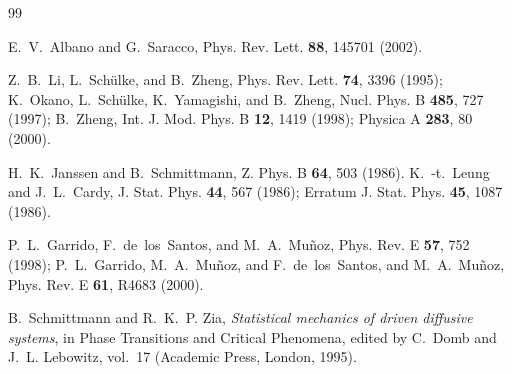 \documentclass[twocolumn,prl,aps]{revtex4}
\begin{document}
\vspace{-1cm}
\begin{thebibliography}{99}

E.~V.~Albano and G.~Saracco,
Phys. Rev. Lett. {\bf 88}, 145701 (2002).

Z.~B.~Li, L.~Sch\"ulke, and B.~Zheng,
Phys. Rev. Lett. {\bf 74}, 3396 (1995);
K.~Okano, L.~Sch\"ulke, K.~Yamagishi, and B.~Zheng,
Nucl. Phys. B {\bf 485}, 727 (1997); 
B.~Zheng,
Int. J. Mod. Phys. B {\bf 12}, 1419 (1998);
Physica A {\bf 283}, 80 (2000).

H.~K.~Janssen and B.~Schmittmann,
Z. Phys. B {\bf 64}, 503 (1986).
K.~-t.~Leung and J.~L.~Cardy,
J. Stat. Phys. {\bf 44}, 567 (1986); 
Erratum J. Stat. Phys. {\bf 45}, 1087 (1986).

P.~L.~Garrido, F.~de~los~Santos, and M.~A.~Mu{\~n}oz,
Phys. Rev. E {\bf 57}, 752 (1998);
P.~L.~Garrido, M.~A.~Mu{\~n}oz, and  F.~de~los~Santos, and M.~A.~Mu{\~n}oz,
Phys. Rev. E {\bf 61}, R4683 (2000).



B.~Schmittmann and R.~K.~P. Zia,
{\sl Statistical mechanics of driven diffusive systems},
in Phase Transitions and Critical Phenomena, edited by C.~Domb
  and J.~L. Lebowitz, vol.~17 (Academic Press, London, 1995).

\end{thebibliography}
\end{document}
